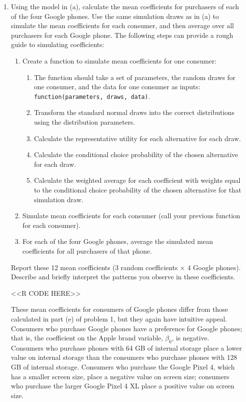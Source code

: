 \documentclass[11pt,letterpaper]{article}
\begin{document}
\begin{enumerate}[label=\alph*., leftmargin=*]
	\item Using the model in (a), calculate the mean coefficients for purchasers of each of the four Google phones. Use the same simulation draws as in (a) to simulate the mean coefficients for each consumer, and then average over all purchasers for each Google phone. The following steps can provide a rough guide to simulating coefficients:
	\begin{enumerate}[label=\Roman*.]
		\item Create a function to simulate mean coefficients for one consumer:
		\begin{enumerate}[label=\roman*.]
			\item The function should take a set of parameters, the random draws for one consumer, and the data for one consumer as inputs: \texttt{function(parameters, draws, data)}.
			\item Transform the standard normal draws into the correct distributions using the distribution parameters.
			\item Calculate the representative utility for each alternative for each draw.
			\item Calculate the conditional choice probability of the chosen alternative for each draw.
			\item Calculate the weighted average for each coefficient with weights equal to the conditional choice probability of the chosen alternative for that simulation draw.
		\end{enumerate}
		\item Simulate mean coefficients for each consumer (call your previous function for each consumer).
		\item For each of the four Google phones, average the simulated mean coefficients for all purchasers of that phone.
	\end{enumerate}
	Report these 12 mean coefficients (3 random coefficients $\times$ 4 Google phones). Describe and briefly interpret the patterns you observe in these coefficients.

	<<R CODE HERE>>

	These mean coefficients for consumers of Google phones differ from those calculated in part (e) of problem 1, but they again have intuitive appeal. Consumers who purchase Google phones have a preference for Google phones; that is, the coefficient on the Apple brand variable, $\beta_0$, is negative. Consumers who purchase phones with 64 GB of internal storage place a lower value on internal storage than the consumers who purchase phones with 128 GB of internal storage. Consumers who purchase the Google Pixel 4, which has a smaller screen size, place a negative value on screen size; consumers who purchase the larger Google Pixel 4 XL place a positive value on screen size.


\end{enumerate}
\end{document}
